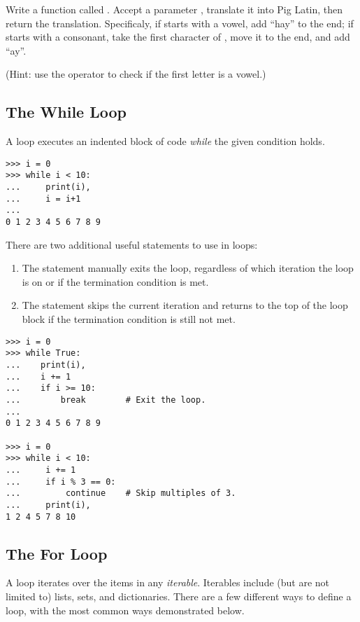 \begin{problem}
Write a function called .
Accept a parameter , translate it into Pig Latin, then return the translation.
Specificaly, if  starts with a vowel, add ``hay'' to the end; if  starts with a consonant, take the first character of , move it to the end, and add ``ay''.

(Hint: use the  operator to check if the first letter is a vowel.)
\end{problem}

\subsection*{The While Loop}
A  loop executes an indented block of code \emph{while} the given condition holds. 

\begin{lstlisting}
>>> i = 0
>>> while i < 10:        
...     print(i),            
...     i = i+1
...     
0 1 2 3 4 5 6 7 8 9
\end{lstlisting}

There are two additional useful statements to use in loops:
\begin{enumerate}
\item The  statement manually exits the loop, regardless of which iteration the loop is on or if the termination condition is met.
\item The  statement skips the current iteration and returns to the top of the loop block if the termination condition is still not met.
\end{enumerate}

\begin{lstlisting}
>>> i = 0
>>> while True:
...    print(i),
...    i += 1
...    if i >= 10:
...        break        # Exit the loop.
...
0 1 2 3 4 5 6 7 8 9

>>> i = 0
>>> while i < 10:
...     i += 1
...     if i % 3 == 0:
...         continue    # Skip multiples of 3.
...     print(i),
1 2 4 5 7 8 10

\end{lstlisting}

\subsection*{The For Loop}
A  loop iterates over the items in any \emph{iterable}.
Iterables include (but are not limited to) lists, sets, and dictionaries.
There are a few different ways to define a  loop, with the most common ways demonstrated below.

